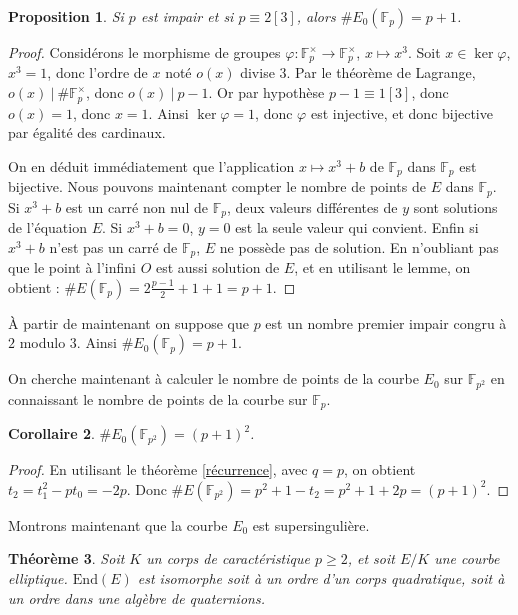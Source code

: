 \documentclass{article}
\theoremstyle{plain}%
\newtheorem{thm}{Théorème}[section]
\newtheorem{prop}[thm]{Proposition}
\newtheorem{cor}[thm]{Corollaire}
\theoremstyle{definition}%
\newcommand{\F}{\mathbb{F}}
\begin{document}
\begin{prop}
  Si $p$ est impair et si $p \equiv 2 [3]$, alors $\#E_0(\F_{p}) = p+1$.
\end{prop}

\begin{proof}
  Considérons le morphisme de groupes $\varphi \colon \F_{p}^\times \to \F_{p}^\times$, $x \mapsto x^3$. 
  Soit $x\in \ker \varphi$, $x^3 = 1$, donc l'ordre de $x$ noté $o(x)$ divise $3$. 
  Par le théorème de Lagrange, $o(x)\ |\ \#\F_{p}^\times$, donc $o(x)\ |\ p-1$. 
  Or par hypothèse $p-1\equiv 1[3]$, donc $o(x) = 1$, donc $x = 1$.
  Ainsi $\ker \varphi = {1}$, donc $\varphi$ est injective, et donc bijective par égalité des cardinaux.

  On en déduit immédiatement que l'application $x \mapsto x^3 + b$ de $\F_{p}$ dans $\F_{p}$ est bijective.
  Nous pouvons maintenant compter le nombre de points de $E$ dans $\F_{p}$. 
  Si $x^3 + b$ est un carré non nul de $\F_{p}$, deux valeurs différentes de $y$ sont solutions de l'équation $E$. 
  Si $x^3 + b = 0$, $y = 0$ est la seule valeur qui convient.
  Enfin si $x^3 + b$ n'est pas un carré de $\F_{p}$, $E$ ne possède pas de solution.
  En n'oubliant pas que le point à l'infini $O$ est aussi solution de $E$, et en utilisant le lemme, on obtient : $\#E(\F_{p}) = 2\frac{p-1}{2} + 1 + 1 = p+1$.
\end{proof}

À partir de maintenant on suppose que $p$ est un nombre premier impair congru à $2$ modulo $3$. 
Ainsi $\#E_0(\F_{p}) = p+1$. 


On cherche maintenant à calculer le nombre de points de la courbe $E_0$ sur $\F_{p^2}$ en connaissant le nombre de points de la courbe sur $\F_{p}$.

\begin{cor}
$\#E_0(\F_{p^2}) = (p+1)^2$.
\end{cor}

\begin{proof}
  En utilisant le théorème \ref{récurrence}, avec $q = p$, on obtient $t_2 = t_1^2 - pt_0 = -2p$. Donc $\#E(\F_{p^2}) = p^2 + 1 - t_2 = p^2 + 1 + 2p = (p+1)^2$.
\end{proof}


Montrons maintenant que la courbe $E_0$ est supersingulière.

\begin{thm}
  Soit $K$ un corps de caractéristique $p\ge 2$, et soit $E/K$ une courbe elliptique. $\mathrm{End}(E)$ est isomorphe soit à un ordre d'un corps quadratique, soit à un ordre dans une algèbre de quaternions. 
\end{thm}
\end{document}
